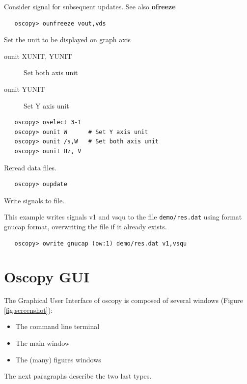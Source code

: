 \documentclass[a4paper,11pt]{article}
\begin{document}
   Consider signal for subsequent updates. See also \textbf{ofreeze}
\begin{verbatim}
   oscopy> ounfreeze vout,vds
\end{verbatim}

   Set the unit to be displayed on graph axis
   \begin{description}
   \item[ounit XUNIT, YUNIT] Set both axis unit
   \item[ounit YUNIT] Set Y axis unit
   \end{description}

\begin{verbatim}
   oscopy> oselect 3-1
   oscopy> ounit W      # Set Y axis unit
   oscopy> ounit /s,W   # Set both axis unit
   oscopy> ounit Hz, V
\end{verbatim}

   Reread data files.

\begin{verbatim}
   oscopy> oupdate
\end{verbatim}

   Write signals to file.

   This example writes signals v1 and vsqu to the file \texttt{demo/res.dat} using format gnucap format,
   overwriting the file if it already exists.
\begin{verbatim}
   oscopy> owrite gnucap (ow:1) demo/res.dat v1,vsqu
\end{verbatim}
\newpage
\section{Oscopy GUI}
The Graphical User Interface of oscopy is composed of several windows (Figure \ref{fig:screenshot}):
\begin{itemize}
\item The command line terminal
\item The main window
\item The (many) figures windows
\end{itemize}
The next paragraphs describe the two last types.
\end{document}

